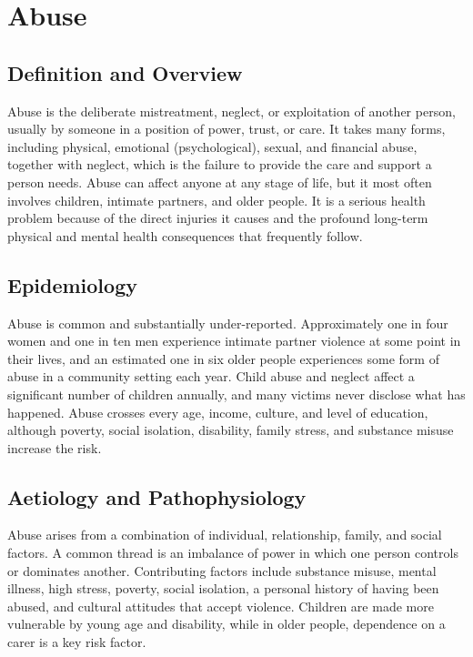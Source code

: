 \chapter{Abuse}

\section*{Definition and Overview}
Abuse is the deliberate mistreatment, neglect, or exploitation of another person, usually by someone in a position of power, trust, or care. It takes many forms, including physical, emotional (psychological), sexual, and financial abuse, together with neglect, which is the failure to provide the care and support a person needs. Abuse can affect anyone at any stage of life, but it most often involves children, intimate partners, and older people. It is a serious health problem because of the direct injuries it causes and the profound long-term physical and mental health consequences that frequently follow.

\section*{Epidemiology}
Abuse is common and substantially under-reported. Approximately one in four women and one in ten men experience intimate partner violence at some point in their lives, and an estimated one in six older people experiences some form of abuse in a community setting each year. Child abuse and neglect affect a significant number of children annually, and many victims never disclose what has happened. Abuse crosses every age, income, culture, and level of education, although poverty, social isolation, disability, family stress, and substance misuse increase the risk.

\section*{Aetiology and Pathophysiology}
Abuse arises from a combination of individual, relationship, family, and social factors. A common thread is an imbalance of power in which one person controls or dominates another. Contributing factors include substance misuse, mental illness, high stress, poverty, social isolation, a personal history of having been abused, and cultural attitudes that accept violence. Children are made more vulnerable by young age and disability, while in older people, dependence on a carer is a key risk factor.

